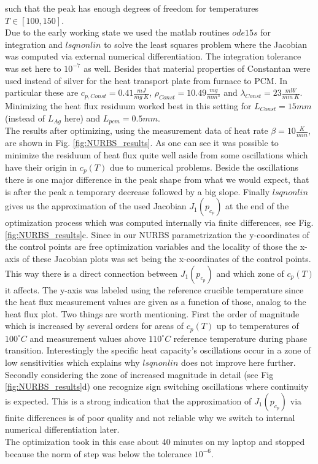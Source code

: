 \documentclass{scrartcl}[12pt, halfparskip]
\begin{document}
such that the peak has enough degrees of freedom for temperatures $T \in [100, 150]$. \\
Due to the early working state we used the matlab routines $ode15s$ for integration and $lsqnonlin$ to solve the least squares problem where the Jacobian was computed via external numerical differentiation. The integration tolerance was set here to $10^{-7}$ as well. Besides that material properties of Constantan were used instead of silver for the heat transport plate from furnace to PCM. In particular these are $c_{p,Const}=0.41\frac{mJ}{mg \ K}$, $\rho_{Const}=10.49\frac{mg}{mm^3}$ and $\lambda_{Const}=23\frac{mW}{mm \ K}$. \\
Minimizing the heat flux residuum worked best in this setting for $L_{Const}=15mm$ (instead of $L_{Ag}$ here) and $L_{pcm}=0.5mm$. \\
The results after optimizing, using the measurement data of heat rate $\beta = 10 \frac{K}{min}$, are shown in Fig. \ref{fig:NURBS_results}. As one can see it was possible to minimize the residuum of heat flux quite well aside from some oscillations which have their origin in $c_p(T)$ due to numerical problems. Beside the oscillations there is one major difference in the peak shape from what we would expect, that is after the peak a temporary decrease followed by a big slope.
Finally $lsqnonlin$ gives us the approximation of the used Jacobian $J_1(p_{c_p})$ at the end of the optimization process which was computed internally via finite differences, see Fig. \ref{fig:NURBS_results}c. Since in our NURBS parametrization the y-coordinates of the control points are free optimization variables and the locality of those the x-axis of these Jacobian plots was set being the x-coordinates of the control points. This way there is a direct connection between $J_1(p_{c_p})$ and which zone of $c_p(T)$ it affects. The y-axis was labeled using the reference crucible temperature since the heat flux measurement values are given as a function of those, analog to the heat flux plot.
Two things are worth mentioning. First the order of magnitude which is increased by several orders for areas of $c_p(T)$ up to temperatures of $100^\circ C$ and measurement values above $110^\circ C$ reference temperature during phase transition. Interestingly the specific heat capacity's oscillations occur in a zone of low sensitivities which explains why $lsqnonlin$ does not improve here further. 
Secondly considering the zone of increased magnitude in detail (see Fig \ref{fig:NURBS_results}d) one recognize sign switching oscillations where continuity is expected. This is a strong indication that the approximation of $J_1(p_{c_p})$ via finite differences is of poor quality and not reliable why we switch to internal numerical differentiation later. \\
The optimization took in this case about 40 minutes on my laptop and stopped because the norm of step was below the tolerance $10^{-6}$.
\end{document}
